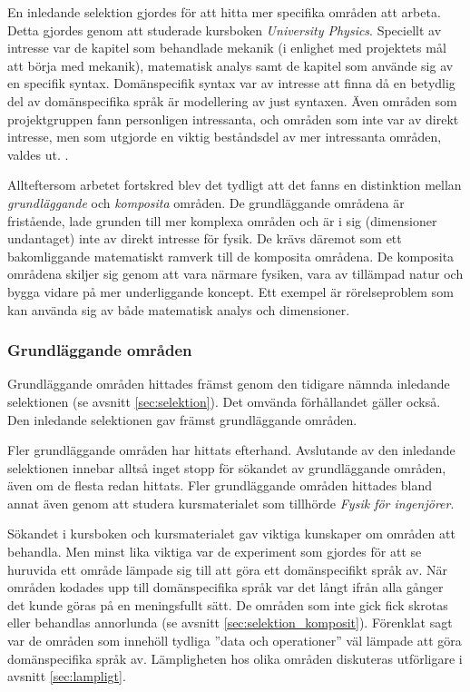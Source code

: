 \begin{binge}
En inledande selektion gjordes för att hitta mer specifika områden att arbeta. Detta gjordes genom att studerade kursboken \textit{University Physics}. Speciellt av intresse var de kapitel som behandlade mekanik (i enlighet med projektets mål att börja med mekanik), matematisk analys samt de kapitel som använde sig av en specifik syntax. Domänspecifik syntax var av intresse att finna då en betydlig del av domänspecifika språk är modellering av just syntaxen. Även områden som projektgruppen fann personligen intressanta, och områden som inte var av direkt intresse, men som utgjorde en viktig beståndsdel av mer intressanta områden, valdes ut. .

Allteftersom arbetet fortskred blev det tydligt att det fanns en distinktion mellan \textit{grundläggande} och \textit{komposita} områden. De grundläggande områdena är fristående, lade grunden till mer komplexa områden och är i sig (dimensioner undantaget) inte av direkt intresse för fysik. De krävs däremot som ett bakomliggande matematiskt ramverk till de komposita områdena.  De komposita områdena skiljer sig genom att vara närmare fysiken, vara av tillämpad natur och bygga vidare på mer underliggande koncept. Ett exempel är rörelseproblem som kan använda sig av både matematisk analys och dimensioner.

\subsubsection{Grundläggande områden}

Grundläggande områden hittades främst genom den tidigare nämnda inledande selektionen (se avsnitt \ref{sec:selektion}). Det omvända förhållandet gäller också. Den inledande selektionen gav främst grundläggande områden.

Fler grundläggande områden har hittats efterhand. Avslutande av den inledande selektionen innebar alltså inget stopp för sökandet av grundläggande områden, även om de flesta redan hittats. Fler grundläggande områden hittades bland annat även genom att studera kursmaterialet som tillhörde \textit{Fysik för ingenjörer}.

Sökandet i kursboken och kursmaterialet gav viktiga kunskaper om områden att behandla. Men minst lika viktiga var de experiment som gjordes för att se huruvida ett område lämpade sig till att göra ett domänspecifikt språk av. När områden kodades upp till domänspecifika språk var det långt ifrån alla gånger det kunde göras på en meningsfullt sätt. De områden som inte gick fick skrotas eller behandlas annorlunda (se avsnitt \ref{sec:selektion_komposit}). Förenklat sagt var de områden som innehöll tydliga ''data och operationer'' väl lämpade att göra domänspecifika språk av. Lämpligheten hos olika områden diskuteras utförligare i avsnitt \ref{sec:lampligt}.


\end{binge}
